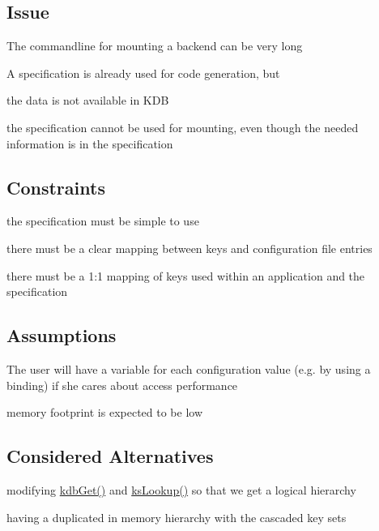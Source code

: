 \subsection*{Issue}


\begin{DoxyItemize}
\item The commandline for mounting a backend can be very long
\item A specification is already used for code generation, but
\begin{DoxyItemize}
\item the data is not available in K\+D\+B
\item the specification cannot be used for mounting, even though the needed information is in the specification
\end{DoxyItemize}
\end{DoxyItemize}

\subsection*{Constraints}


\begin{DoxyItemize}
\item the specification must be simple to use
\item there must be a clear mapping between keys and configuration file entries
\item there must be a 1\+:1 mapping of keys used within an application and the specification
\end{DoxyItemize}

\subsection*{Assumptions}


\begin{DoxyItemize}
\item The user will have a variable for each configuration value (e.\+g. by using a binding) if she cares about access performance
\item memory footprint is expected to be low
\end{DoxyItemize}

\subsection*{Considered Alternatives}


\begin{DoxyItemize}
\item modifying \hyperlink{group__kdb_ga28e385fd9cb7ccfe0b2f1ed2f62453a1}{kdb\+Get()} and \hyperlink{group__keyset_gaa34fc43a081e6b01e4120daa6c112004}{ks\+Lookup()} so that we get a logical hierarchy
\item having a duplicated in memory hierarchy with the cascaded key sets
\end{DoxyItemize}

